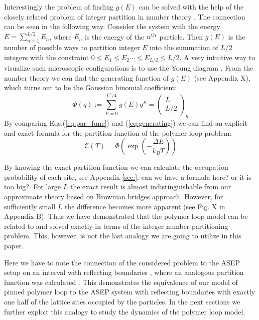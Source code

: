 \documentclass[aps,showpacs,twocolumn,floatfix,prx,superscriptaddress]{revtex4-1}
\begin{document}
Interestingly the problem of finding $g(E)$ can be solved with the help of the closely related problem of integer partition in number theory \cite{Andrews1998}. 
The connection can be seen in the following way. Consider the system with the energy $E=\sum_{n=1}^{L/2}E_n$, where $E_n$ is the energy of the $n^{\rm{th}}$ particle. Then $g(E)$ is the number of possible ways to partition integer $E$ into the summation of $L/2$ integers with the constraint $0\le E_1\le E_2\cdots\le E_{L/2}\le L/2$.
A very intuitive way to visualize such microscopic configurations is to use the Young diagram \cite{Andrews1998}. From the number theory \cite{Andrews1998} we can find the generating function of $g(E)$ (see Appendix X), which turns out to be the Gaussian binomial coefficient:
\begin{equation}
    \Phi (q) := \sum_{E=0}^{L^2/4} g(E) q^E = \left(\begin{array}{c} L \\ L/2 \end{array}\right)_q
\label{eq:generating}
\end{equation}
By comparing Eqs.(\ref{eq:par_func}) and (\ref{eq:generating}) we can find an explicit and exact formula for the partition function of the polymer loop problem:
\begin{equation}
\label{eq:par_func_exact}
    \mathcal{Z}\left(T\right) = \Phi \left(\exp\left(-\frac{\Delta E}{k_B T}\right)\right) 
\end{equation}


By knowing the exact partition function we can calculate the occupation probability of each site, see Appendix \ref{sec:}. {\color{red} can we have a formula here? or it is too big?}. For large $L$ the exact result is almost indistinguishable from our approximate theory based on Brownian bridges approach. However, for sufficiently small $L$ the difference becomes more apparent (see Fig. X in Appendix B). Thus we have demonstrated that the polymer loop model can be related to and solved exactly in terms of the integer number partitioning problem. This, however, is not the last analogy we are going to utilize in this paper.

Here we have to note the connection of the considered problem to the ASEP setup on an interval with reflecting boundaries \cite{Schutz2001,Derrida1998} , where an analogous partition function was calculated \cite{Sandow1994}. This demonstrates the equivalence of our model of pinned polymer loop to the ASEP system with reflecting boundaries with exactly one half of the lattice sites occupied by the particles. In the next sections we further exploit this analogy to study the dynamics of the polymer loop model.
\end{document}
